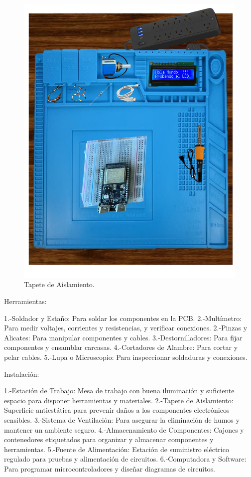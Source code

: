 \begin{itemize}
\begin{figure}[H]
        \includegraphics[scale=0.30]{1/img/Colocacion de Piezas.pdf}
        \caption{Tapete de Aislamiento.}
    \end{figure}
    \end{itemize}
    Herramientas:
    
    1.-Soldador y Estaño: Para soldar los componentes en la PCB.
    2.-Multímetro: Para medir voltajes, corrientes y resistencias, y verificar conexiones.
    2.-Pinzas y Alicates: Para manipular componentes y cables.
    3.-Destornilladores: Para fijar componentes y ensamblar carcasas.
    4.-Cortadores de Alambre: Para cortar y pelar cables.
    5.-Lupa o Microscopio: Para inspeccionar soldaduras y conexiones.
    
    Instalación:
    
    1.-Estación de Trabajo: Mesa de trabajo con buena iluminación y suficiente espacio para disponer herramientas y materiales.
    2.-Tapete de Aislamiento: Superficie antiestática para prevenir daños a los componentes electrónicos sensibles.
    3.-Sistema de Ventilación: Para asegurar la eliminación de humos y mantener un ambiente seguro.
    4.-Almacenamiento de Componentes: Cajones y contenedores etiquetados para organizar y almacenar componentes y herramientas.
    5.-Fuente de Alimentación: Estación de suministro eléctrico regulado para pruebas y alimentación de circuitos.
    6.-Computadora y Software: Para programar microcontroladores y diseñar diagramas de circuitos.
    
